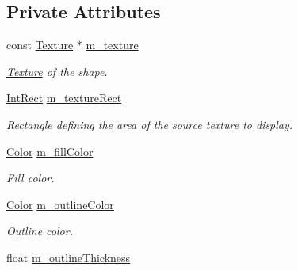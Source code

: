 \subsection*{Private Attributes}
\begin{DoxyCompactItemize}
\item 
\mbox{\label{classsf_1_1_shape_ab9b472ae590101afeb5a8e00e2487550}} 
const \mbox{\hyperlink{classsf_1_1_texture}{Texture}} $\ast$ \mbox{\hyperlink{classsf_1_1_shape_ab9b472ae590101afeb5a8e00e2487550}{m\+\_\+texture}}
\begin{DoxyCompactList}\small\item\em \mbox{\hyperlink{classsf_1_1_texture}{Texture}} of the shape. \end{DoxyCompactList}\item 
\mbox{\label{classsf_1_1_shape_a45b33e918d0f061e81de4fb1746c8e28}} 
\mbox{\hyperlink{classsf_1_1_rect}{Int\+Rect}} \mbox{\hyperlink{classsf_1_1_shape_a45b33e918d0f061e81de4fb1746c8e28}{m\+\_\+texture\+Rect}}
\begin{DoxyCompactList}\small\item\em Rectangle defining the area of the source texture to display. \end{DoxyCompactList}\item 
\mbox{\label{classsf_1_1_shape_afdd52ef012f4a4843fd89793d01bcfdc}} 
\mbox{\hyperlink{classsf_1_1_color}{Color}} \mbox{\hyperlink{classsf_1_1_shape_afdd52ef012f4a4843fd89793d01bcfdc}{m\+\_\+fill\+Color}}
\begin{DoxyCompactList}\small\item\em Fill color. \end{DoxyCompactList}\item 
\mbox{\label{classsf_1_1_shape_a65c07a005b8e9b8a335a24f678e4dea4}} 
\mbox{\hyperlink{classsf_1_1_color}{Color}} \mbox{\hyperlink{classsf_1_1_shape_a65c07a005b8e9b8a335a24f678e4dea4}{m\+\_\+outline\+Color}}
\begin{DoxyCompactList}\small\item\em Outline color. \end{DoxyCompactList}\item 
\mbox{\label{classsf_1_1_shape_a0c11dc8ff170665c01c96a667807925f}} 
float \mbox{\hyperlink{classsf_1_1_shape_a0c11dc8ff170665c01c96a667807925f}{m\+\_\+outline\+Thickness}}

\end{DoxyCompactItemize}
